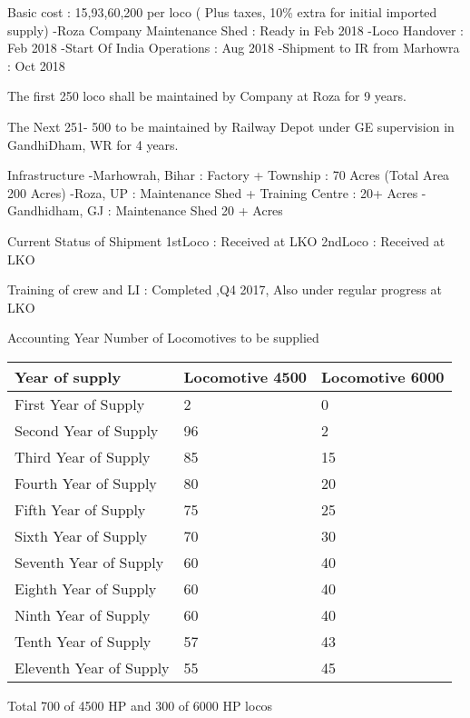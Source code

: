 \documentclass[
  ignorenonframetext,
]{beamer}
\begin{document}
\begin{frame}{Basic cost : 15,93,60,200 per loco ( Plus taxes, 10\%
extra for initial imported supply)}
\protect\hypertarget{basic-cost-159360200-per-loco-plus-taxes-10-extra-for-initial-imported-supply}{}
-Roza Company Maintenance Shed : Ready in Feb 2018 -Loco Handover : Feb
2018 -Start Of India Operations : Aug 2018 -Shipment to IR from Marhowra
: Oct 2018

The first 250 loco shall be maintained by Company at Roza for 9 years.

The Next 251- 500 to be maintained by Railway Depot under GE supervision
in GandhiDham, WR for 4 years.

Infrastructure -Marhowrah, Bihar : Factory + Township : 70 Acres (Total
Area 200 Acres) -Roza, UP : Maintenance Shed + Training Centre : 20+
Acres -Gandhidham, GJ : Maintenance Shed 20 + Acres
\end{frame}

\begin{frame}{Current Status of Shipment}
\protect\hypertarget{current-status-of-shipment}{}
1stLoco : Received at LKO 2ndLoco : Received at LKO

Training of crew and LI : Completed ,Q4 2017, Also under regular
progress at LKO

Accounting Year Number of Locomotives to be supplied

\begin{longtable}[]{@{}lll@{}}
\toprule
Year of supply & Locomotive 4500 & Locomotive 6000 \\
\midrule
\endhead
First Year of Supply & 2 & 0 \\
Second Year of Supply & 96 & 2 \\
Third Year of Supply & 85 & 15 \\
Fourth Year of Supply & 80 & 20 \\
Fifth Year of Supply & 75 & 25 \\
Sixth Year of Supply & 70 & 30 \\
Seventh Year of Supply & 60 & 40 \\
Eighth Year of Supply & 60 & 40 \\
Ninth Year of Supply & 60 & 40 \\
Tenth Year of Supply & 57 & 43 \\
Eleventh Year of Supply & 55 & 45 \\
\bottomrule
\end{longtable}

Total 700 of 4500 HP and 300 of 6000 HP locos

\end{frame}
\end{document}
